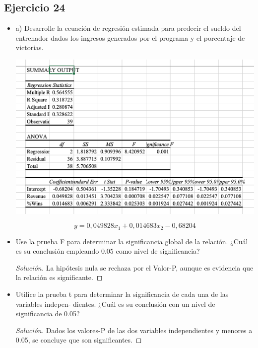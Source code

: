 \documentclass[a4paper,12pt]{article}
\newenvironment{solution}
  {\renewcommand\qedsymbol{$\blacksquare$}\begin{proof}[Solución]}
  {\end{proof}}
\begin{document}
\subsection{Ejercicio 24}
\begin{itemize}
    \item a) Desarrolle la ecuación de regresión estimada para predecir el sueldo del entrenador dados los ingresos generados por el programa y el porcentaje de victorias.
    \begin{center}
        \includegraphics[scale=0.5]{Imagenes/50-24.png}
    \end{center}
    $$y= 0,049828x_1+0,014683x_2-0,68204$$
    \item Use la prueba F para determinar la significancia global de la relación. ¿Cuál es su conclusión empleando 0.05 como nivel de significancia?
    \begin{solution}
    La hipótesis nula se rechaza por el Valor-P, aunque es evidencia que la relación es significante.
    \end{solution}
    \item Utilice la prueba t para determinar la significancia de cada una de las variables indepen- dientes. ¿Cuál es su conclusión con un nivel de significancia de 0.05?
    \begin{solution}
    Dados los valores-P de las dos variables independientes y menores a 0.05, se concluye que son significantes.
    \end{solution}
\end{itemize}
\end{document}
